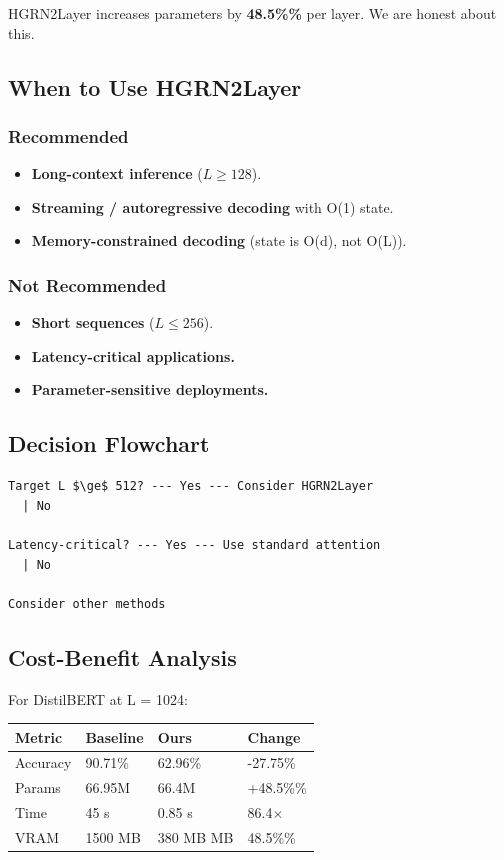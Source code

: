 HGRN2Layer increases parameters by \textbf{48.5\%\%} per layer. We are 
honest about this.

\subsection{When to Use HGRN2Layer}

\subsubsection{Recommended}
\begin{itemize}
\item \textbf{Long-context inference} ($L \geq 128$).
\item \textbf{Streaming / autoregressive decoding} with O(1) state.
\item \textbf{Memory-constrained decoding} (state is O(d), not O(L)).

\end{itemize}
\subsubsection{Not Recommended}
\begin{itemize}
\item \textbf{Short sequences} ($L \leq 256$).
\item \textbf{Latency-critical applications.}
\item \textbf{Parameter-sensitive deployments.}

\end{itemize}
\subsection{Decision Flowchart}

\begin{lstlisting}
Target L $\ge$ 512? --- Yes --- Consider HGRN2Layer
  | No
   
Latency-critical? --- Yes --- Use standard attention
  | No
   
Consider other methods
\end{lstlisting}

\subsection{Cost-Benefit Analysis}

For DistilBERT at L = 1024:

\begin{table}[H]
\centering
\small
\begin{tabular}{llll}
\toprule
\textbf{Metric} & \textbf{Baseline} & \textbf{Ours} & \textbf{Change} \\
\midrule
Accuracy & 90.71\% & 62.96\% & -27.75\% \\
Params & 66.95M & 66.4M & +48.5\%\% \\
Time & 45 s & 0.85 s & 86.4$\times$ \\
VRAM & 1500 MB & 380 MB MB & 48.5\%\% \\
\bottomrule
\end{tabular}
\end{table}

